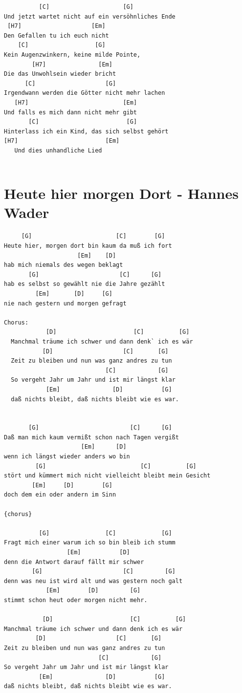 \documentclass[
]{book}
\let\stdsection\section
\renewcommand\section{\clearpage\stdsection}
\begin{document}
\begin{verbatim}
          [C]                     [G]
Und jetzt wartet nicht auf ein versöhnliches Ende 
 [H7]                    [Em]
Den Gefallen tu ich euch nicht 
    [C]                   [G]
Kein Augenzwinkern, keine milde Pointe,
        [H7]               [Em]
Die das Unwohlsein wieder bricht
      [C]                    [G]
Irgendwann werden die Götter nicht mehr lachen 
   [H7]                           [Em]
Und falls es mich dann nicht mehr gibt 
       [C]                         [G]
Hinterlass ich ein Kind, das sich selbst gehört
[H7]                         [Em]
   Und dies unhandliche Lied
   

\end{verbatim}

\hypertarget{mundart-und-deutsch-heute-hier-morgen-dort}{%
\section{Heute hier morgen Dort - Hannes Wader}\label{mundart-und-deutsch-heute-hier-morgen-dort}}

\begin{verbatim}
     [G]                        [C]        [G]
Heute hier, morgen dort bin kaum da muß ich fort
                     [Em]    [D]
hab mich niemals des wegen beklagt
       [G]                       [C]      [G]
hab es selbst so gewählt nie die Jahre gezählt
         [Em]       [D]     [G]
nie nach gestern und morgen gefragt

Chorus:
            [D]                      [C]          [G]
  Manchmal träume ich schwer und dann denk` ich es wär
           [D]                    [C]       [G]
  Zeit zu bleiben und nun was ganz andres zu tun
                             [C]            [G]
  So vergeht Jahr um Jahr und ist mir längst klar
            [Em]               [D]           [G]
  daß nichts bleibt, daß nichts bleibt wie es war.
  

       [G]                          [C]      [G]
Daß man mich kaum vermißt schon nach Tagen vergißt
                      [Em]      [D]
wenn ich längst wieder anders wo bin
         [G]                           [C]          [G]
stört und kümmert mich nicht vielleicht bleibt mein Gesicht
        [Em]     [D]        [G]
doch dem ein oder andern im Sinn

{chorus}

          [G]                [C]             [G]
Fragt mich einer warum ich so bin bleib ich stumm
                  [Em]           [D]
denn die Antwort darauf fällt mir schwer
        [G]                       [C]         [G]
denn was neu ist wird alt und was gestern noch galt
            [Em]        [D]         [G]
stimmt schon heut oder morgen nicht mehr.

           [D]                      [C]          [G]
Manchmal träume ich schwer und dann denk ich es wär
         [D]                    [C]       [G]
Zeit zu bleiben und nun was ganz andres zu tun
                           [C]            [G]
So vergeht Jahr um Jahr und ist mir längst klar
          [Em]               [D]           [G]
daß nichts bleibt, daß nichts bleibt wie es war.
\end{verbatim}
\end{document}
